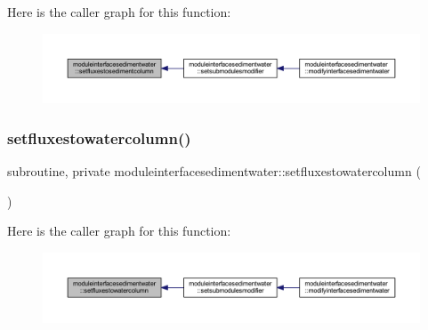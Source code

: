 Here is the caller graph for this function\+:\nopagebreak
\begin{figure}[H]
\begin{center}
\leavevmode
\includegraphics[width=350pt]{namespacemoduleinterfacesedimentwater_a1493bc1b914a1c9424edba0cd5747eef_icgraph}
\end{center}
\end{figure}
\mbox{\label{namespacemoduleinterfacesedimentwater_a9c3a165d2ddf84d84404172f34db61ab}} 
\subsubsection{\texorpdfstring{setfluxestowatercolumn()}{setfluxestowatercolumn()}}
{\footnotesize\ttfamily subroutine, private moduleinterfacesedimentwater\+::setfluxestowatercolumn (\begin{DoxyParamCaption}{ }\end{DoxyParamCaption})\hspace{0.3cm}{\ttfamily [private]}}

Here is the caller graph for this function\+:\nopagebreak
\begin{figure}[H]
\begin{center}
\leavevmode
\includegraphics[width=350pt]{namespacemoduleinterfacesedimentwater_a9c3a165d2ddf84d84404172f34db61ab_icgraph}
\end{center}
\end{figure}
\mbox{\label{namespacemoduleinterfacesedimentwater_a5922862ceb22f053a7ddf81b53a0be8c}} 
